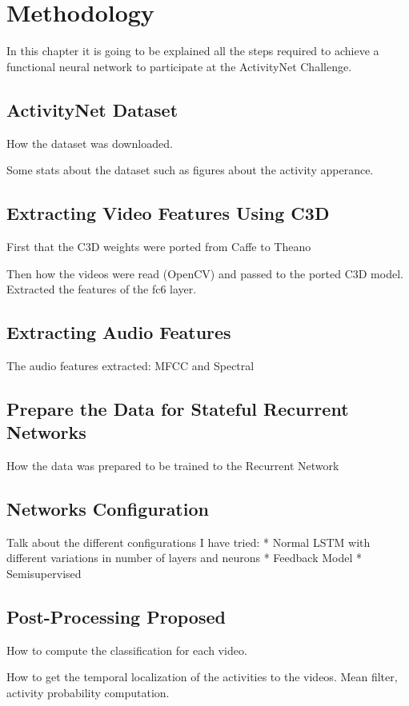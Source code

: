 \chapter{Methodology}

In this chapter it is going to be explained all the steps required to achieve a functional neural network to participate at the ActivityNet Challenge.

\section{ActivityNet Dataset}

How the dataset was downloaded.

Some stats about the dataset such as figures about the activity apperance.

\section{Extracting Video Features Using C3D}

First that the C3D weights were ported from Caffe to Theano

Then how the videos were read (OpenCV) and passed to the ported C3D model. Extracted the features of the fc6 layer.

\section{Extracting Audio Features}

The audio features extracted: MFCC and Spectral

\section{Prepare the Data for Stateful Recurrent Networks}

How the data was prepared to be trained to the Recurrent Network

\section{Networks Configuration}

Talk about the different configurations I have tried:
* Normal LSTM with different variations in number of layers and neurons
* Feedback Model
* Semisupervised

\section{Post-Processing Proposed}

How to compute the classification for each video.

How to get the temporal localization of the activities to the videos.
Mean filter, activity probability computation.
